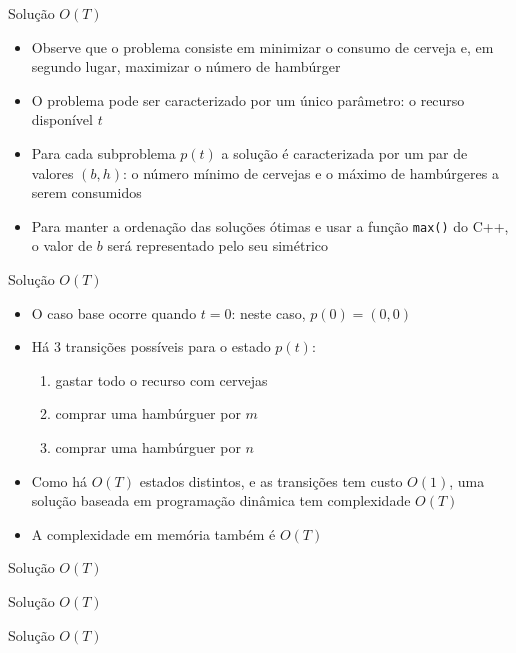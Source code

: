 \begin{frame}[fragile]{Solução $O(T)$}

    \begin{itemize}
        \item Observe que o problema consiste em minimizar o consumo de cerveja e, em segundo lugar,
            maximizar o número de hambúrger

        \item O problema pode ser caracterizado por um único parâmetro: o recurso disponível
            $t$
        
        \item Para cada subproblema $p(t)$ a solução é caracterizada por um par de valores
            $(b, h)$: o número mínimo de cervejas e o máximo de hambúrgeres a serem consumidos 

        \item Para manter a ordenação das soluções ótimas e usar a função \texttt{max()} do 
            C++, o valor de $b$ será representado pelo seu simétrico
   \end{itemize}

\end{frame}

\begin{frame}[fragile]{Solução $O(T)$}

    \begin{itemize}
        \item O caso base ocorre quando $t = 0$: neste caso, $p(0) = (0, 0)$
            
        \item Há 3 transições possíveis para o estado $p(t)$:

        \begin{enumerate}
            \item gastar todo o recurso com cervejas
            \item comprar uma hambúrguer por $m$
            \item comprar uma hambúrguer por $n$
        \end{enumerate}

        \item Como há $O(T)$ estados distintos, e as transições tem custo $O(1)$, uma solução
            baseada em programação dinâmica tem complexidade $O(T)$

        \item A complexidade em memória também é $O(T)$
   \end{itemize}

\end{frame}

\begin{frame}[fragile]{Solução $O(T)$}
\end{frame}

\begin{frame}[fragile]{Solução $O(T)$}
\end{frame}

\begin{frame}[fragile]{Solução $O(T)$}
\end{frame}
